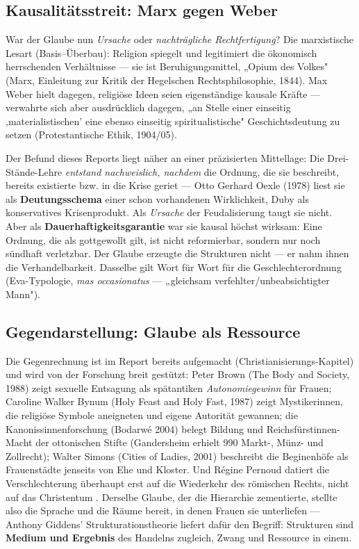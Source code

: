 \documentclass[11pt,a4paper,ngerman]{scrartcl}
\newcommand{\chipbase}[2]{\hspace{0pt}{\footnotesize\textcolor{#1}{[\textsc{#2}]}}}
\newcommand{\chipbelegt}[1]{\chipbase{chipgreen}{#1}}
\newcommand{\chipplausibel}[1]{\chipbase{chipamber}{#1}}
\newcommand{\chipumstritten}[1]{\chipbase{chipred}{#1}}
\begin{document}
\subsection*{Kausalitätsstreit: Marx gegen Weber}

War der Glaube nun \emph{Ursache} oder \emph{nachträgliche Rechtfertigung}? Die marxistische Lesart (Basis–Überbau): Religion spiegelt und legitimiert die ökonomisch herrschenden Verhältnisse — sie ist Beruhigungsmittel, „Opium des Volkes" (Marx, Einleitung zur Kritik der Hegelschen Rechtsphilosophie, 1844). Max Weber hielt dagegen, religiöse Ideen seien eigenständige kausale Kräfte — verwahrte sich aber ausdrücklich dagegen, „an Stelle einer einseitig ‚materialistischen' eine ebenso einseitig spiritualistische" Geschichtsdeutung zu setzen (Protestantische Ethik, 1904/05). \chipbelegt{belegt}

Der Befund dieses Reports liegt näher an einer präzisierten Mittellage: Die Drei-Stände-Lehre \emph{entstand nachweislich, nachdem} die Ordnung, die sie beschreibt, bereits existierte bzw. in die Krise geriet — Otto Gerhard Oexle (1978) liest sie als \textbf{Deutungsschema} einer schon vorhandenen Wirklichkeit, Duby als konservatives Krisenprodukt. Als \emph{Ursache} der Feudalisierung taugt sie nicht. \chipbelegt{belegt} Aber als \textbf{Dauerhaftigkeitsgarantie} war sie kausal höchst wirksam: Eine Ordnung, die als gottgewollt gilt, ist nicht reformierbar, sondern nur noch sündhaft verletzbar. Der Glaube erzeugte die Strukturen nicht — er nahm ihnen die Verhandelbarkeit. Dasselbe gilt Wort für Wort für die Geschlechterordnung (Eva-Typologie, \emph{mas occasionatus} — „gleichsam verfehlter/unbeabsichtigter Mann"). \chipplausibel{plausibel}

\subsection*{Gegendarstellung: Glaube als Ressource}

Die Gegenrechnung ist im Report bereits aufgemacht (Christianisierungs-Kapitel) und wird von der Forschung breit gestützt: Peter Brown (The Body and Society, 1988) zeigt sexuelle Entsagung als spätantiken \emph{Autonomiegewinn} für Frauen; Caroline Walker Bynum (Holy Feast and Holy Fast, 1987) zeigt Mystikerinnen, die religiöse Symbole aneigneten und eigene Autorität gewannen; die Kanonissinnenforschung (Bodarwé 2004) belegt Bildung und Reichsfürstinnen-Macht der ottonischen Stifte (Gandersheim erhielt 990 Markt-, Münz- und Zollrecht); Walter Simons (Cities of Ladies, 2001) beschreibt die Beginenhöfe als Frauenstädte jenseits von Ehe und Kloster. Und Régine Pernoud datiert die Verschlechterung überhaupt erst auf die Wiederkehr des römischen Rechts, nicht auf das Christentum \chipumstritten{umstritten}. Derselbe Glaube, der die Hierarchie zementierte, stellte also die Sprache und die Räume bereit, in denen Frauen sie unterliefen — Anthony Giddens' Strukturationstheorie liefert dafür den Begriff: Strukturen sind \textbf{Medium und Ergebnis} des Handelns zugleich, Zwang und Ressource in einem. \chipplausibel{plausibel}
\end{document}
